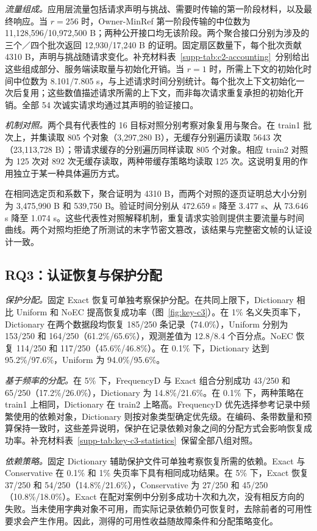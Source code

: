 \documentclass[10pt,journal]{IEEEtran}
\begin{document}
\emph{流量组成。}应用层流量包括请求声明与挑战、需要时传输的第一阶段材料，以及最终响应。当 $r=256$ 时，Owner-MinRef 第一阶段传输的中位数为 11,128,596/10,972,500 B；两种公开接口均无该阶段。两个聚合接口分别为涉及的三个／四个批次返回 12,930/17,240 B 的证明。固定扇区数量下，每个批次贡献 4310 B，声明与挑战随请求变化。补充材料表~\ref*{supp-tab:c2-accounting}~分别给出这些组成部分、服务端读取量与初始化开销。当 $r=1$ 时，所需上下文的初始化时间中位数为 8.101/7.805 s，与上述请求时间分别统计。每个批次上下文初始化一次后复用；这些数值描述请求所需的上下文，而非每次请求重复承担的初始化开销。全部 54 次诚实请求均通过其声明的验证接口。

\emph{机制对照。}两个具有代表性的 16 目标对照分别考察对象复用与聚合。在 train1 批次上，并集读取 805 个对象（3,297,280 B），无缓存分别遍历读取 5643 次（23,113,728 B）；带请求缓存的分别遍历同样读取 805 个对象。相应 train2 对照为 125 次对 892 次无缓存读取，两种带缓存策略均读取 125 次。这说明复用的作用独立于某一种具体遍历方式。

在相同选定页和系数下，聚合证明为 4310 B，而两个对照的逐页证明总大小分别为 3,475,990 B 和 539,750 B。验证时间分别从 472.659 s 降至 3.477 s、从 73.646 s 降至 1.074 s。这些代表性对照解释机制，重复请求实验则提供主要流量与时间曲线。两个对照均拒绝了所测试的末字节密文篡改，该结果与完整密文帧的认证设计一致。

\subsection{RQ3：认证恢复与保护分配}
\emph{保护分配。}固定 Exact 恢复可单独考察保护分配。在共同上限下，Dictionary 相比 Uniform 和 NoEC 提高恢复成功率（图~\ref{fig:key-c3}）。在 1\% 名义失页率下，Dictionary 在两个数据段均恢复 185/250 条记录（74.0\%），Uniform 分别为 153/250 和 164/250（61.2\%/65.6\%），观测差值为 12.8/8.4 个百分点。NoEC 恢复 114/250 和 117/250（45.6\%/46.8\%）。在 0.1\% 下，Dictionary 达到 95.2\%/97.6\%，Uniform 为 94.0\%/95.6\%。

\emph{基于频率的分配。}在 5\% 下，FrequencyD 与 Exact 组合分别成功 43/250 和 65/250（17.2\%/26.0\%），Dictionary 为 14.8\%/21.6\%。在 0.1\% 下，两种策略在 train1 上相同，Dictionary 在 train2 上略高。FrequencyD 优先选择参考记录中频繁使用的依赖对象，Dictionary 则按对象类型确定优先级。在编码、条带数量和预算保持一致时，这些差异说明，保护在记录依赖对象之间的分配方式会影响恢复成功率。补充材料表~\ref*{supp-tab:key-c3-statistics}~保留全部八组对照。

\emph{依赖策略。}固定 Dictionary 辅助保护文件可单独考察恢复所需的依赖。Exact 与 Conservative 在 0.1\% 和 1\% 失页率下具有相同成功结果。在 5\% 下，Exact 恢复 37/250 和 54/250（14.8\%/21.6\%），Conservative 为 27/250 和 45/250（10.8\%/18.0\%）。Exact 在配对案例中分别多成功十次和九次，没有相反方向的失败。当未使用字典对象不可用，而实际记录依赖仍可恢复时，去除前者的可用性要求会产生作用。因此，测得的可用性收益随故障条件和分配策略变化。
\end{document}

